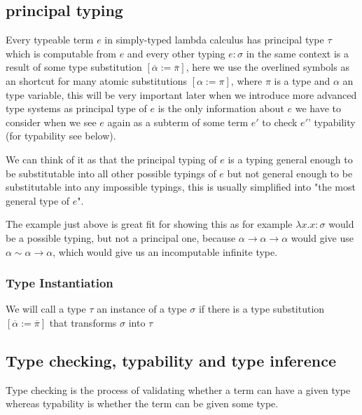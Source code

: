 \subsection{principal typing}

Every typeable term $e$ in simply-typed lambda calculus has principal type $\tau$ which is computable from $e$ and every other typing
$e : \sigma$ in the same context is a result of some type substitution $[\overline{\alpha} := \overline{\pi}]$, here we use the overlined symbols
as an shortcut for many atomic substitutions $[\alpha := \pi]$, where $\pi$ is a type and $\alpha$ an type variable, this will be very important
later when we introduce more advanced type systems as principal type of $e$ is the only information about $e$ we have to consider
when we see $e$ again as a subterm of some term $e'$ to check $e'$' typability (for typability see below). %

We can think of it as that the principal typing of $e$ is a typing general enough to be substitutable into all other possible typings of $e$
but not general enough to be substitutable into any impossible typings, this is usually simplified into "the most general type of $e$". %

The example just above %
is great fit for showing this as for example $\lambda x . x : \sigma$ would be a possible typing, but not a principal one, because
$\alpha \rightarrow \alpha \rightarrow \alpha$ would give use $\alpha \sim \alpha \rightarrow \alpha$, which would give us an incomputable
infinite type.

\subsubsection{Type Instantiation}

We will call a type $\tau$ an instance of a type $\sigma$ if there is a type substitution $[\overline{\alpha} := \overline{\pi}]$
that transforms $\sigma$ into $\tau$ %

\subsection{Type checking, typability and type inference}

Type checking is the process of validating whether a term can have a given type
whereas typability is whether the term can be given some type.


